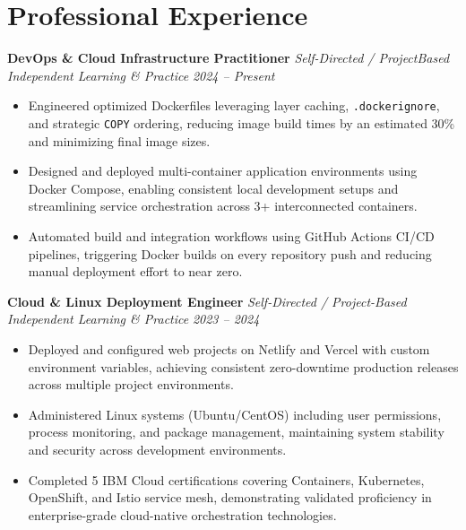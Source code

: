 \documentclass[10pt, letterpaper]{article}
\begin{document}
\section{Professional Experience}
\textbf{DevOps \& Cloud Infrastructure Practitioner} \hfill \textit{Self-Directed / ProjectBased} \\
\textit{Independent Learning \& Practice} \hfill \textit{2024 -- Present}
\begin{itemize}[noitemsep, topsep=3pt, leftmargin=1.2em]
 \item Engineered optimized Dockerfiles leveraging layer caching, \texttt{.dockerignore}, and strategic \texttt{COPY} ordering, reducing image build times by an estimated 30\% and minimizing final image sizes.
 \item Designed and deployed multi-container application environments using Docker Compose, enabling consistent local development setups and streamlining service orchestration across 3+ interconnected containers.
 \item Automated build and integration workflows using GitHub Actions CI/CD pipelines, triggering Docker builds on every repository push and reducing manual deployment effort to near zero.
\end{itemize}
\vspace{6pt}
\textbf{Cloud \& Linux Deployment Engineer} \hfill \textit{Self-Directed / Project-Based} \\
\textit{Independent Learning \& Practice} \hfill \textit{2023 -- 2024}
\begin{itemize}[noitemsep, topsep=3pt, leftmargin=1.2em]
 \item Deployed and configured web projects on Netlify and Vercel with custom environment variables, achieving consistent zero-downtime production releases across multiple project environments.
 \item Administered Linux systems (Ubuntu/CentOS) including user permissions, process monitoring, and package management, maintaining system stability and security across development environments.
 \item Completed 5 IBM Cloud certifications covering Containers, Kubernetes, OpenShift, and Istio service mesh, demonstrating validated proficiency in enterprise-grade cloud-native orchestration technologies.
\end{itemize}
\end{document}
